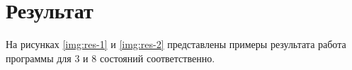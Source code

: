 \chapter{Результат}

На рисунках \ref{img:res-1} и \ref{img:res-2} представлены примеры результата работа программы 
для 3 и 8 состояний соответственно.


{}

